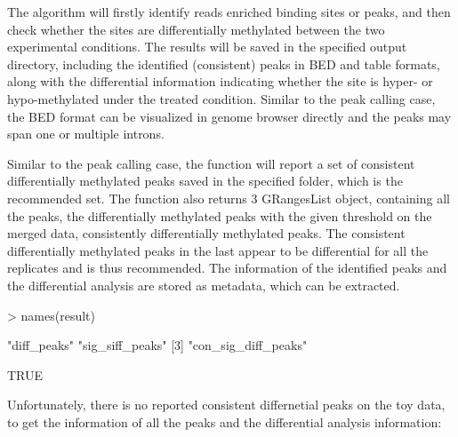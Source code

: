 \documentclass[]{article}
\begin{document}
The algorithm will firstly identify reads enriched binding sites or peaks, and then check whether the sites are differentially methylated between the two experimental conditions. The results will be saved in the specified output directory, including the identified (consistent) peaks in BED and table formats, along with the differential information indicating whether the site is hyper- or hypo-methylated under the treated condition. Similar to the peak calling case, the BED format can be visualized in genome browser directly and the peaks may span one or multiple introns. 

Similar to the peak calling case, the function will report a set of consistent differentially methylated peaks saved in the specified folder,  which is the recommended set. The function also returns 3 GRangesList object, containing all the peaks, the differentially methylated peaks with the given threshold on the merged data, consistently differentially methylated peaks. The consistent differentially methylated peaks in the last appear to be differential for all the replicates and is thus recommended. The information of the identified peaks and the differential analysis are stored as metadata, which can be extracted. 

\begin{Schunk}
\begin{Sinput}
> names(result)
\end{Sinput}
\begin{Soutput}
[1] "diff_peaks"         "sig_siff_peaks"    
[3] "con_sig_diff_peaks"
\end{Soutput}
\begin{Soutput}
[1] TRUE
\end{Soutput}
\end{Schunk}

Unfortunately, there is no reported consistent differnetial peaks on the toy data, to get the information of all the peaks and the differential analysis information:
\end{document}
